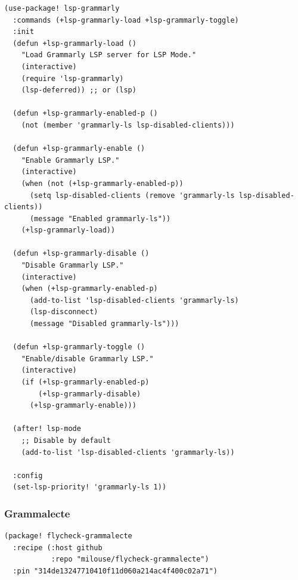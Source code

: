 \documentclass[11pt]{article}
\begin{document}
\begin{verbatim}
(use-package! lsp-grammarly
  :commands (+lsp-grammarly-load +lsp-grammarly-toggle)
  :init
  (defun +lsp-grammarly-load ()
    "Load Grammarly LSP server for LSP Mode."
    (interactive)
    (require 'lsp-grammarly)
    (lsp-deferred)) ;; or (lsp)

  (defun +lsp-grammarly-enabled-p ()
    (not (member 'grammarly-ls lsp-disabled-clients)))

  (defun +lsp-grammarly-enable ()
    "Enable Grammarly LSP."
    (interactive)
    (when (not (+lsp-grammarly-enabled-p))
      (setq lsp-disabled-clients (remove 'grammarly-ls lsp-disabled-clients))
      (message "Enabled grammarly-ls"))
    (+lsp-grammarly-load))

  (defun +lsp-grammarly-disable ()
    "Disable Grammarly LSP."
    (interactive)
    (when (+lsp-grammarly-enabled-p)
      (add-to-list 'lsp-disabled-clients 'grammarly-ls)
      (lsp-disconnect)
      (message "Disabled grammarly-ls")))

  (defun +lsp-grammarly-toggle ()
    "Enable/disable Grammarly LSP."
    (interactive)
    (if (+lsp-grammarly-enabled-p)
        (+lsp-grammarly-disable)
      (+lsp-grammarly-enable)))

  (after! lsp-mode
    ;; Disable by default
    (add-to-list 'lsp-disabled-clients 'grammarly-ls))

  :config
  (set-lsp-priority! 'grammarly-ls 1))
\end{verbatim}

\subsubsection{Grammalecte}
\label{sec:org6bfe0f3}

\begin{verbatim}
(package! flycheck-grammalecte
  :recipe (:host github
           :repo "milouse/flycheck-grammalecte")
  :pin "314de13247710410f11d060a214ac4f400c02a71")
\end{verbatim}
\end{document}
